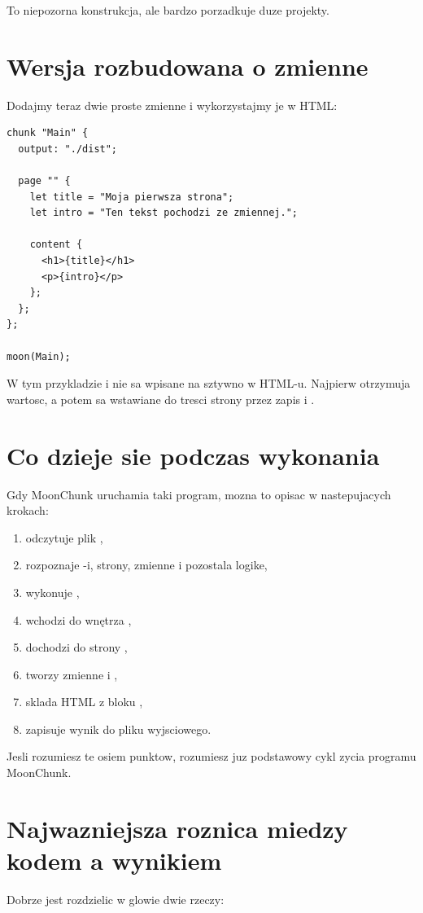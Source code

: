 To niepozorna konstrukcja, ale bardzo porzadkuje duze projekty.

\section{Wersja rozbudowana o zmienne}
Dodajmy teraz dwie proste zmienne i wykorzystajmy je w HTML:

\begin{lstlisting}[style=moonchunk,caption={Pierwszy program z danymi dynamicznymi}]
chunk "Main" {
  output: "./dist";

  page "" {
    let title = "Moja pierwsza strona";
    let intro = "Ten tekst pochodzi ze zmiennej.";

    content {
      <h1>{title}</h1>
      <p>{intro}</p>
    };
  };
};

moon(Main);
\end{lstlisting}

W tym przykladzie  i  nie sa wpisane na sztywno w HTML-u.
Najpierw otrzymuja wartosc, a potem sa wstawiane do tresci strony przez zapis
 i .

\section{Co dzieje sie podczas wykonania}
Gdy MoonChunk uruchamia taki program, mozna to opisac w nastepujacych krokach:

\begin{enumerate}
  \item odczytuje plik ,
  \item rozpoznaje -i, strony, zmienne i pozostala logike,
  \item wykonuje ,
  \item wchodzi do wnętrza ,
  \item dochodzi do strony ,
  \item tworzy zmienne  i ,
  \item sklada HTML z bloku ,
  \item zapisuje wynik do pliku wyjsciowego.
\end{enumerate}

Jesli rozumiesz te osiem punktow, rozumiesz juz podstawowy cykl zycia programu
MoonChunk.

\section{Najwazniejsza roznica miedzy kodem a wynikiem}
Dobrze jest rozdzielic w glowie dwie rzeczy:

